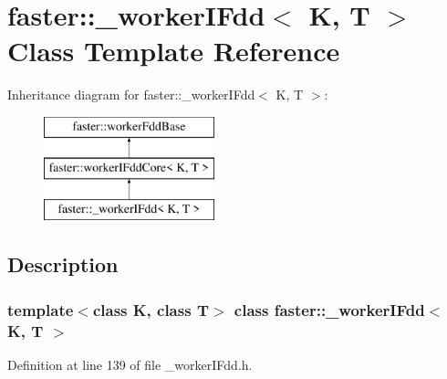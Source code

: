 \hypertarget{classfaster_1_1__workerIFdd}{}\section{faster\+:\+:\+\_\+worker\+I\+Fdd$<$ K, T $>$ Class Template Reference}
\label{classfaster_1_1__workerIFdd}
Inheritance diagram for faster\+:\+:\+\_\+worker\+I\+Fdd$<$ K, T $>$\+:\begin{figure}[H]
\begin{center}
\leavevmode
\includegraphics[height=3.000000cm]{classfaster_1_1__workerIFdd}
\end{center}
\end{figure}


\subsection{Description}
\subsubsection*{template$<$class K, class T$>$\newline
class faster\+::\+\_\+worker\+I\+Fdd$<$ K, T $>$}



Definition at line 139 of file \+\_\+worker\+I\+Fdd.\+h.

